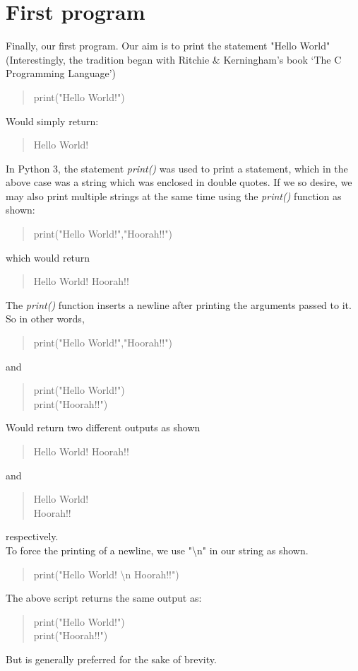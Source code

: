 \section{First program}
Finally, our first program. Our aim is to print the statement "Hello World" (Interestingly, the tradition began with Ritchie \& Kerningham's book `The C Programming Language')\begin{quote}
print("Hello World!")
\end{quote}
Would simply return:
\begin{quote}
Hello World!
\end{quote}
In Python 3, the statement \emph{print()} was used to print a statement, which in the above case was a string which was enclosed in double quotes. 
If we so desire, we may also print multiple strings at the same time using the \emph{print()} function as shown:
\begin{quote}
print("Hello World!","Hoorah!!")
\end{quote}
which would return
\begin{quote}
Hello World! Hoorah!!
\end{quote}
The \emph{print()} function inserts a newline after printing the arguments passed to it. So in other words,
\begin{quote}
print("Hello World!","Hoorah!!")
\end{quote}
and 
\begin{quote}
print("Hello World!")\\
print("Hoorah!!")
\end{quote}
Would return two different outputs as shown
\begin{quote}
Hello World! Hoorah!!
\end{quote}
and 
\begin{quote}
Hello World!\\
Hoorah!!
\end{quote}
respectively.\\
To force the printing of a newline, we use "\textbackslash n" in our string as shown.
\begin{quote}
print("Hello World! \textbackslash n Hoorah!!")
\end{quote}
The above script returns the same output as:
\begin{quote}
print("Hello World!")\\
print("Hoorah!!")
\end{quote}
But is generally preferred for the sake of brevity.
